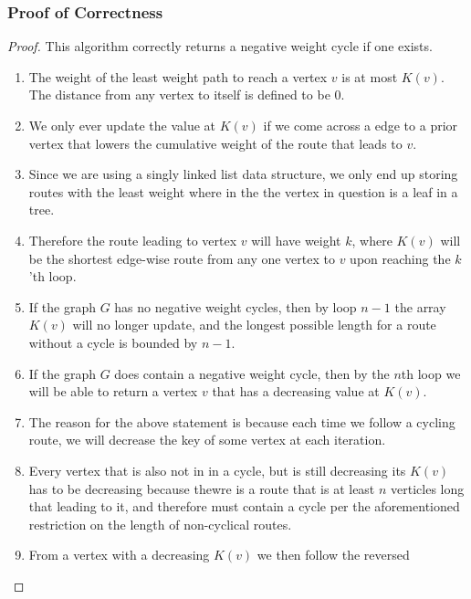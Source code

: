 \documentclass{article}
\begin{document}
\subsubsection{Proof of Correctness}
\begin{proof} This algorithm correctly returns a negative weight cycle if one exists.
      \begin{enumerate}
            \item The weight of the least weight path to reach a vertex \(v\) is at most
                  \(K(v)\). The distance from any vertex to itself is defined to be 0.
            \item We only ever update the value at \(K(v)\) if we come across a edge to a
                  prior vertex that lowers the cumulative weight of the route that leads to
                  \(v\).
            \item Since we are using a singly linked list data structure, we only end up
                  storing routes with the least weight where in the the vertex in question is a
                  leaf in a tree.
            \item Therefore the route leading to vertex \(v\) will have weight \(k\),
                  where \(K(v)\) will be the shortest edge-wise route from any one vertex
                  to \(v\) upon reaching the \(k\)'th loop.
            \item If the graph \(G\) has no negative weight cycles, then by loop \(n-1\)
                  the array \(K(v)\) will no longer update, and the longest possible length for
                  a route without a cycle is bounded by \(n-1\).
            \item If the graph \(G\) does contain a negative weight cycle, then by the
                  \(n\)th loop we will be able to return a vertex \(v\) that has a decreasing
                  value at \(K(v)\).
            \item The reason for the above statement is because each time we follow a
                  cycling route, we will decrease the key of some vertex at each iteration.
            \item Every vertex that is also not in in a cycle, but is still decreasing its
                  \(K(v)\) has to be decreasing because thewre is a route that is at least \(n\)
                  verticles long that leading to it, and therefore must contain a cycle per the
                  aforementioned restriction on the length of non-cyclical routes.
            \item From a vertex with a decreasing \(K(v)\) we then follow the reversed

\end{enumerate}
\end{proof}
\end{document}
